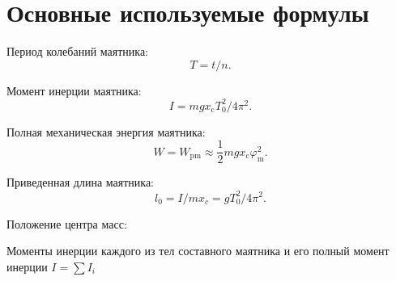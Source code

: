 \section{Основные используемые формулы}
Период колебаний маятника:
\begin{equation}\label{mainEq:period}
    T=t/n .
\end{equation}

Момент инерции маятника:
\begin{equation}\label{mainEq:momentOfInertion}
    I=m g x_{\mathrm{c}} T_0^2 / 4 \pi^2 .
\end{equation}

Полная механическая энергия маятника:
\begin{equation}\label{mainEq:potentionEnergy}
    W = W_{\mathrm{pm}} \approx \frac{1}{2} m g x_{\mathrm{c}} \varphi_{\mathrm{m}}^2 .
\end{equation}

Приведенная длина маятника:
\begin{equation}\label{eq:approxLength}
    l_0=I / m x_c=g T_0^2 / 4 \pi^2 .
\end{equation}

Положение центра масс:

Моменты инерции каждого из тел составного маятника и его полный момент инерции $I = \sum I_i$

\newpage